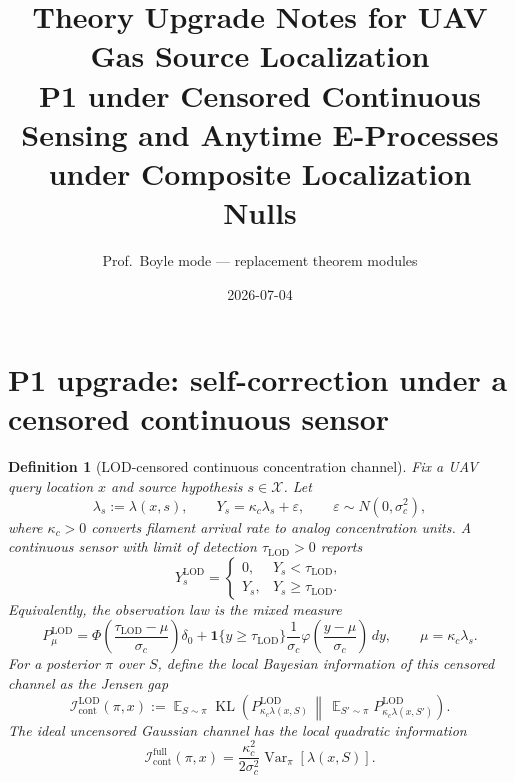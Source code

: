 \documentclass[11pt]{article}
\newtheorem{definition}[theorem]{Definition}
\DeclareMathOperator{\E}{\mathbb{E}}
\DeclareMathOperator{\Var}{\mathrm{Var}}
\DeclareMathOperator{\KL}{\mathrm{KL}}
\newcommand{\X}{\mathcal{X}}
\newcommand{\Icont}{\mathcal{I}_{\mathrm{cont}}}
\newcommand{\Ilod}{\mathcal{I}_{\mathrm{cont}}^{\mathrm{LOD}}}
\newcommand{\ph}{\varphi}
\newcommand{\Ph}{\Phi}
\begin{document}
\title{Theory Upgrade Notes for UAV Gas Source Localization\\
\large P1 under Censored Continuous Sensing and Anytime E-Processes under Composite Localization Nulls}
\author{Prof.\ Boyle mode --- replacement theorem modules}
\date{2026-07-04}
\maketitle

\section{P1 upgrade: self-correction under a censored continuous sensor}

\begin{definition}[LOD-censored continuous concentration channel]\label{def:lod-channel}
Fix a UAV query location $x$ and source hypothesis $s\in\X$.  Let
\[
        \lambda_s:=\lambda(x,s),\qquad
        Y_s=\kappa_c\lambda_s+\varepsilon,\qquad
        \varepsilon\sim N(0,\sigma_c^2),
\]
where $\kappa_c>0$ converts filament arrival rate to analog concentration units.  A continuous sensor with limit of detection $\tau_{\mathrm{LOD}}>0$ reports
\[
        Y_s^{\mathrm{LOD}}
        =
        \begin{cases}
        0, & Y_s<\tau_{\mathrm{LOD}},\\
        Y_s, & Y_s\geq \tau_{\mathrm{LOD}}.
        \end{cases}
\]
Equivalently, the observation law is the mixed measure
\begin{equation}
        P_{\mu}^{\mathrm{LOD}}
        =
        \Ph\!\left(\frac{\tau_{\mathrm{LOD}}-\mu}{\sigma_c}\right)\delta_0
        +
        \mathbf{1}\{y\geq \tau_{\mathrm{LOD}}\}
        \frac{1}{\sigma_c}\ph\!\left(\frac{y-\mu}{\sigma_c}\right)\,dy,
        \qquad
        \mu=\kappa_c\lambda_s .
        \label{eq:lod-mixed-law}
\end{equation}
For a posterior $\pi$ over $S$, define the local Bayesian information of this censored channel as the Jensen gap
\[
        \Ilod(\pi,x)
        :=
        \E_{S\sim\pi}
        \KL\!\left(
        P_{\kappa_c\lambda(x,S)}^{\mathrm{LOD}}
        \,\middle\|\,
        \E_{S'\sim\pi}P_{\kappa_c\lambda(x,S')}^{\mathrm{LOD}}
        \right).
\]
The ideal uncensored Gaussian channel has the local quadratic information
\[
        \Icont^{\mathrm{full}}(\pi,x)
        =
        \frac{\kappa_c^2}{2\sigma_c^2}\Var_{\pi}[\lambda(x,S)].
\]
\end{definition}
\end{document}
